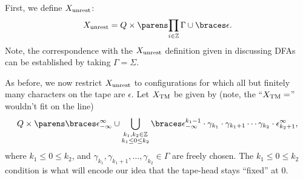 \documentclass{fkpaper}
\begin{document}
\begin{multicols}{2}

First, we define $X_{\rm unrest}$:
\[
  X_{\rm unrest} = Q \times \pn{\prod_{i \in \ZZ} \Gamma \cup
    \set{\epsilon}}.
\]
Note, the correspondence with the $X_{\rm unrest}$ definition given in
discussing DFAs can be established by taking $\Gamma = \Sigma$.

As before, we now restrict $X_{\rm unrest}$ to configurations for
which all but finitely many characters on the tape are $\epsilon$. Let
$X_{\rm TM}$ be given by (note, the ``$X_{\rm TM}=$'' wouldn't fit on
the line)
\[
  Q \times \pn{\set{\epsilon_{-\infty}^{\infty}} \cup
    \bigcup_{\substack{k_1, k_2 \in \ZZ \\ k_1 \leq 0 \leq k_2}}
    \set{\epsilon_{-\infty}^{k_1-1}\cdot \gamma_{k_1} \cdot
      \gamma_{k_1 + 1} \cdots \gamma_{k_2} \cdot
      \epsilon_{k_2+1}^\infty}},
\]
where $k_1 \leq 0 \leq k_2$, and $\gamma_{k_1}, \gamma_{k_1 + 1},
\ldots, \gamma_{k_2} \in \Gamma$ are freely chosen. The $k_1 \leq
0\leq k_2$ condition is what will encode our idea that the tape-head
stays ``fixed'' at $0$. %



\end{multicols}
\end{document}

